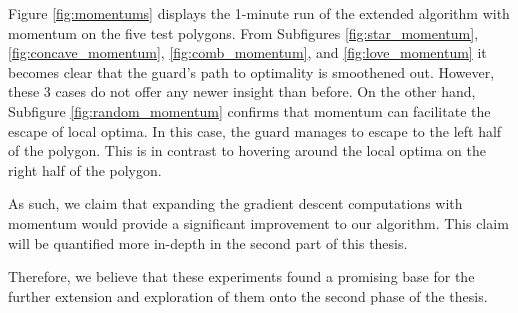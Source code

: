 Figure \ref{fig:momentums} displays the 1-minute run of the extended algorithm with momentum on the five test polygons. From Subfigures \ref{fig:star_momentum}, \ref{fig:concave_momentum}, \ref{fig:comb_momentum}, and \ref{fig:love_momentum} it becomes clear that the guard's path to optimality is smoothened out. However, these 3 cases do not offer any newer insight than before. On the other hand, Subfigure \ref{fig:random_momentum} confirms that momentum can facilitate the escape of local optima. In this case, the guard manages to escape to the left half of the polygon. This is in contrast to hovering around the local optima on the right half of the polygon.

As such, we claim that expanding the gradient descent computations with momentum would provide a significant improvement to our algorithm. This claim will be quantified more in-depth in the second part of this thesis. 

Therefore, we believe that these experiments found a promising base for the further extension and exploration of them onto the second phase of the thesis.